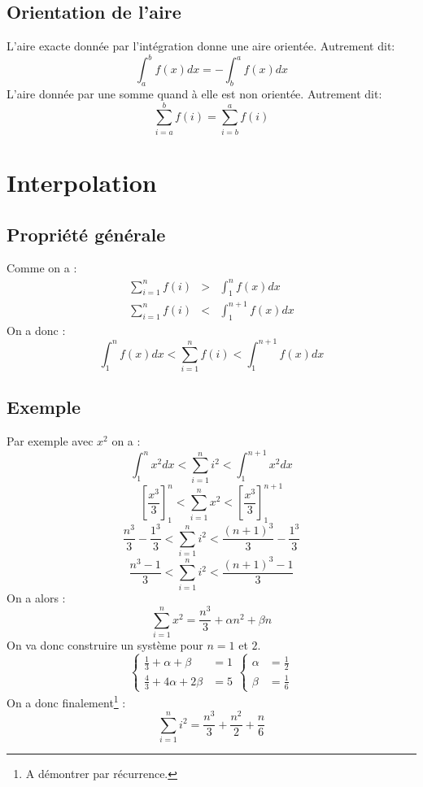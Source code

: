 \documentclass[a4paper,10pt]{report}
\begin{document}
\subsection{Orientation de l'aire}
L'aire exacte donnée par l'intégration donne une aire orientée. Autrement dit:
$$\int_{a}^{b} f(x) dx = -\int_{b}^{a} f(x) dx$$
L'aire donnée par une somme quand à elle est non orientée. Autrement dit:
$$\sum_{i=a}^{b} f(i) = \sum_{i=b}^{a} f(i)$$
\section{Interpolation}
\subsection{Propriété générale}
Comme on a :
\begin{eqnarray*}
\sum_{i=1}^{n} f(i) & >  & \int_{1}^{n} f(x)dx\\
\sum_{i=1}^{n} f(i) & < & \int_{1}^{n+1} f(x)dx
\end{eqnarray*}
On a donc :
$$\int_{1}^{n} f(x)dx < \sum_{i=1}^{n} f(i) < \int_{1}^{n+1} f(x)dx$$
\subsection{Exemple}
Par exemple avec $x^2$ on a :
$$\int_{1}^{n} x^2 dx < \sum_{i=1}^{n} i^2 < \int_{1}^{n+1} x^2 dx$$
$${\left[ \frac{x^3}{3} \right]}_{1}^{n} < \sum_{i=1}^{n} x^2 < {\left[ \frac{x^3}{3} \right]}_{1}^{n+1}$$
$$\frac{n^3}{3} - \frac{1^3}{3} < \sum_{i=1}^{n} i^2 < \frac{(n+1)^3}{3}-\frac{1^3}{3}$$
$$\frac{n^3-1}{3} < \sum_{i=1}^{n} i^2 < \frac{(n+1)^3-1}{3}$$
On a alors :
$$\sum_{i=1}^{n} x^2 = \frac{n^3}{3} + \alpha n^2 + \beta n$$
On va donc construire un système pour $n=1$ et $2$.
$$\left\{\begin{array}{ll}
 \frac{1}{3} + \alpha + \beta & = 1\\
 \frac{4}{3} + 4 \alpha + 2 \beta & = 5
 \end{array}\right. \left\{\begin{array}{ll}
 \alpha & = \frac{1}{2}\\
 \beta & = \frac{1}{6}
 \end{array}\right.$$
On a donc finalement\footnote{A démontrer par récurrence.} :
$$\sum_{i=1}^{n} i^2 = \frac{n^3}{3} + \frac{n^2}{2} + \frac{n}{6}$$
\end{document}
